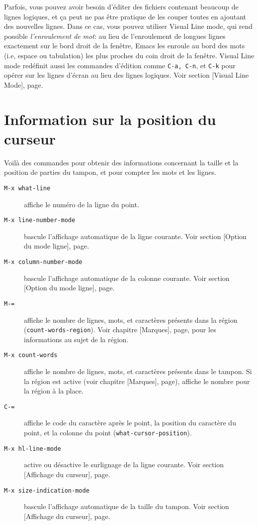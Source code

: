 Parfois, vous pouvez avoir besoin d'éditer des fichiers contenant
beaucoup de lignes logiques, et ça peut ne pas être pratique de les
couper toutes en ajoutant des nouvelles lignes. Dans ce cas, vous
pouvez utiliser Visual Line mode, qui rend possible
\emph{l'enroulement de mot}: au lieu de l'enroulement de longues
lignes exactement sur le bord droit de la fenêtre, Emacs les enroule
au bord des mots (i.e, espace ou tabulation) les plus proches du coin
droit de la fenêtre. Visual Line mode redéfinit aussi les commandes
d'édition comme \texttt{C-a, C-n}, et \texttt{C-k} pour opérer sur les
lignes d'écran au lieu des lignes logiques. Voir section
[Visual Line Mode], page.\par

\section{Information sur la position du curseur}
Voilà des commandes pour obtenir des informations concernant la taille
et la position de parties du tampon, et pour compter les mots et les
lignes.
\begin{description}
\item[\texttt{M-x what-line}] affiche le numéro de la ligne du point.
\item[\texttt{M-x line-number-mode}] bascule l'affichage automatique
  de la ligne courante. Voir section [Option du mode
  ligne], page.
\item[\texttt{M-x column-number-mode}] bascule l'affichage automatique
  de la colonne courante. Voir section [Option du mode
  ligne], page.
\item[\texttt{M-=}] affiche le nombre de lignes, mots, et caractères
  présents dans la région (\texttt{count-words-region}). Voir
  chapitre [Marques], page, pour les informations au
  sujet de la région.
\item[\texttt{M-x count-words}] affiche le nombre de lignes, mots, et
  caractères présents dans le tampon. Si la région est active (voir
  chapitre [Marques], page), affiche le nombre pour
  la région à la place.
\item[\texttt{C-=}] affiche le code du caractère après le point, la
  position du caractère du point, et la colonne du point
  (\texttt{what-cursor-position}).
\item[\texttt{M-x hl-line-mode}] active ou désactive le surlignage de
  la ligne courante. Voir section [Affichage du
  curseur], page.
\item[\texttt{M-x size-indication-mode}] bascule l'affichage
  automatique de la taille du tampon. Voir section [Affichage du
  curseur], page.
\end{description}
